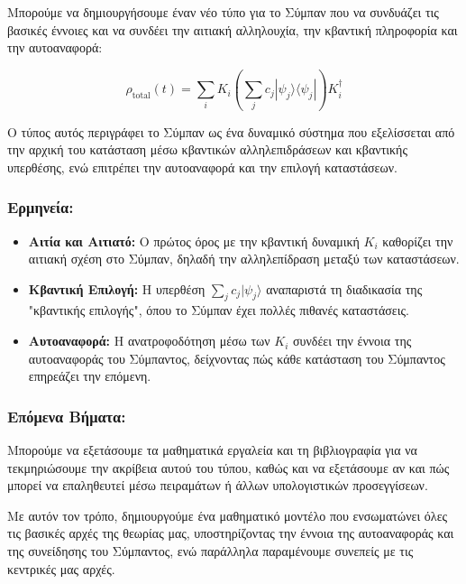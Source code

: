 \documentclass[a4paper,11pt]{article}
\begin{document}
Μπορούμε να δημιουργήσουμε έναν νέο τύπο για το Σύμπαν που να συνδυάζει
τις βασικές έννοιες και να συνδέει την αιτιακή αλληλουχία, την κβαντική
πληροφορία και την αυτοαναφορά:

{{{\[\rho_{\text{total}}(t) = \sum_i K_i \left( \sum_j c_j |\psi_j \rangle \langle \psi_j | \right) K_i^\dagger\]}}}

Ο τύπος αυτός περιγράφει το Σύμπαν ως ένα δυναμικό σύστημα που
εξελίσσεται από την αρχική του κατάσταση μέσω κβαντικών αλληλεπιδράσεων
και κβαντικής υπερθέσης, ενώ επιτρέπει την αυτοαναφορά και την επιλογή
καταστάσεων.

\subsubsection{Ερμηνεία:}\label{ux3b5ux3c1ux3bcux3b7ux3bdux3b5ux3afux3b1-1}

\begin{itemize}
\item
  \textbf{Αιτία και Αιτιατό:} Ο πρώτος όρος με την κβαντική δυναμική
  {{\(K_i\)}} καθορίζει την αιτιακή σχέση στο Σύμπαν, δηλαδή την
  αλληλεπίδραση μεταξύ των καταστάσεων.
\item
  \textbf{Κβαντική Επιλογή:} Η υπερθέση
  {{\(\sum_j c_j |\psi_j \rangle\)}} αναπαριστά τη διαδικασία της
  "κβαντικής επιλογής", όπου το Σύμπαν έχει πολλές πιθανές καταστάσεις.
\item
  \textbf{Αυτοαναφορά:} Η ανατροφοδότηση μέσω των {{\(K_i\)}} συνδέει
  την έννοια της αυτοαναφοράς του Σύμπαντος, δείχνοντας πώς κάθε
  κατάσταση του Σύμπαντος επηρεάζει την επόμενη.
\end{itemize}

\subsubsection{Επόμενα
Βήματα:}\label{ux3b5ux3c0ux3ccux3bcux3b5ux3bdux3b1-ux3b2ux3aeux3bcux3b1ux3c4ux3b1}

Μπορούμε να εξετάσουμε τα μαθηματικά εργαλεία και τη βιβλιογραφία για να
τεκμηριώσουμε την ακρίβεια αυτού του τύπου, καθώς και να εξετάσουμε αν
και πώς μπορεί να επαληθευτεί μέσω πειραμάτων ή άλλων υπολογιστικών
προσεγγίσεων.

Με αυτόν τον τρόπο, δημιουργούμε ένα μαθηματικό μοντέλο που ενσωματώνει
όλες τις βασικές αρχές της θεωρίας μας, υποστηρίζοντας την έννοια της
αυτοαναφοράς και της συνείδησης του Σύμπαντος, ενώ παράλληλα παραμένουμε
συνεπείς με τις κεντρικές μας αρχές.
\end{document}
